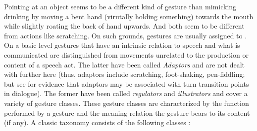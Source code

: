 \documentclass[output=paper]{langsci/langscibook}
\begin{document}
Pointing at an object seems to be a different kind of gesture than mimicking drinking by moving a bent hand (virutally holding something) towards the mouth while slightly roating the back of hand upwards.
%
And both seem to be different from actions like scratching.
% 
On such grounds, gestures are usually assigned to .
%
On a basic level gestures that have an intrinsic relation to speech and what is communicated are distinguished from movements unrelated to the production or content of a speech act. 
%
The latter have been called \emph{Adaptors}  \citep{Ekman:Friesen:1969} and are not dealt with further here (thus, adaptors include scratching, foot-shaking, pen-fiddling; but see \citet{Zywiczynski:Wacewicz:Orzechowski:2017} for evidence that adaptors may be associated with turn transition points in dialogue).
%
The former have been called \emph{regulators}  and \emph{illustrators}  \citep{Ekman:Friesen:1969} and cover a variety of gesture classes.
%
These gesture classes are characterized by the function performed by a gesture and the meaning relation the gesture bears to its content (if any).
%
A classic taxonomy consists of the following classes \citep{McNeill:1992}:
%
\end{document}
